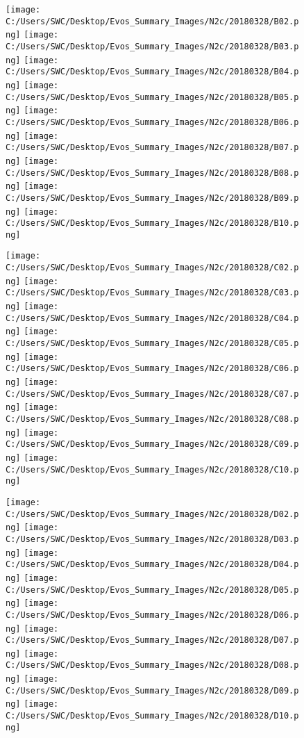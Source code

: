 \documentclass{article}
\begin{document}
\begin{figure}[htp]
\centering
\texttt{[image: C:/Users/SWC/Desktop/Evos\_Summary\_Images/N2c/20180328/B02.png]}\quad
\texttt{[image: C:/Users/SWC/Desktop/Evos\_Summary\_Images/N2c/20180328/B03.png]}\quad
\texttt{[image: C:/Users/SWC/Desktop/Evos\_Summary\_Images/N2c/20180328/B04.png]}\quad
\texttt{[image: C:/Users/SWC/Desktop/Evos\_Summary\_Images/N2c/20180328/B05.png]}\quad
\texttt{[image: C:/Users/SWC/Desktop/Evos\_Summary\_Images/N2c/20180328/B06.png]}\quad
\texttt{[image: C:/Users/SWC/Desktop/Evos\_Summary\_Images/N2c/20180328/B07.png]}\quad
\texttt{[image: C:/Users/SWC/Desktop/Evos\_Summary\_Images/N2c/20180328/B08.png]}\quad
\texttt{[image: C:/Users/SWC/Desktop/Evos\_Summary\_Images/N2c/20180328/B09.png]}\quad
\texttt{[image: C:/Users/SWC/Desktop/Evos\_Summary\_Images/N2c/20180328/B10.png]}\quad

\medskip

\texttt{[image: C:/Users/SWC/Desktop/Evos\_Summary\_Images/N2c/20180328/C02.png]}\quad
\texttt{[image: C:/Users/SWC/Desktop/Evos\_Summary\_Images/N2c/20180328/C03.png]}\quad
\texttt{[image: C:/Users/SWC/Desktop/Evos\_Summary\_Images/N2c/20180328/C04.png]}\quad
\texttt{[image: C:/Users/SWC/Desktop/Evos\_Summary\_Images/N2c/20180328/C05.png]}\quad
\texttt{[image: C:/Users/SWC/Desktop/Evos\_Summary\_Images/N2c/20180328/C06.png]}\quad
\texttt{[image: C:/Users/SWC/Desktop/Evos\_Summary\_Images/N2c/20180328/C07.png]}\quad
\texttt{[image: C:/Users/SWC/Desktop/Evos\_Summary\_Images/N2c/20180328/C08.png]}\quad
\texttt{[image: C:/Users/SWC/Desktop/Evos\_Summary\_Images/N2c/20180328/C09.png]}\quad
\texttt{[image: C:/Users/SWC/Desktop/Evos\_Summary\_Images/N2c/20180328/C10.png]}\quad

\medskip

\texttt{[image: C:/Users/SWC/Desktop/Evos\_Summary\_Images/N2c/20180328/D02.png]}\quad
\texttt{[image: C:/Users/SWC/Desktop/Evos\_Summary\_Images/N2c/20180328/D03.png]}\quad
\texttt{[image: C:/Users/SWC/Desktop/Evos\_Summary\_Images/N2c/20180328/D04.png]}\quad
\texttt{[image: C:/Users/SWC/Desktop/Evos\_Summary\_Images/N2c/20180328/D05.png]}\quad
\texttt{[image: C:/Users/SWC/Desktop/Evos\_Summary\_Images/N2c/20180328/D06.png]}\quad
\texttt{[image: C:/Users/SWC/Desktop/Evos\_Summary\_Images/N2c/20180328/D07.png]}\quad
\texttt{[image: C:/Users/SWC/Desktop/Evos\_Summary\_Images/N2c/20180328/D08.png]}\quad
\texttt{[image: C:/Users/SWC/Desktop/Evos\_Summary\_Images/N2c/20180328/D09.png]}\quad
\texttt{[image: C:/Users/SWC/Desktop/Evos\_Summary\_Images/N2c/20180328/D10.png]}\quad


\end{figure}
\end{document}
